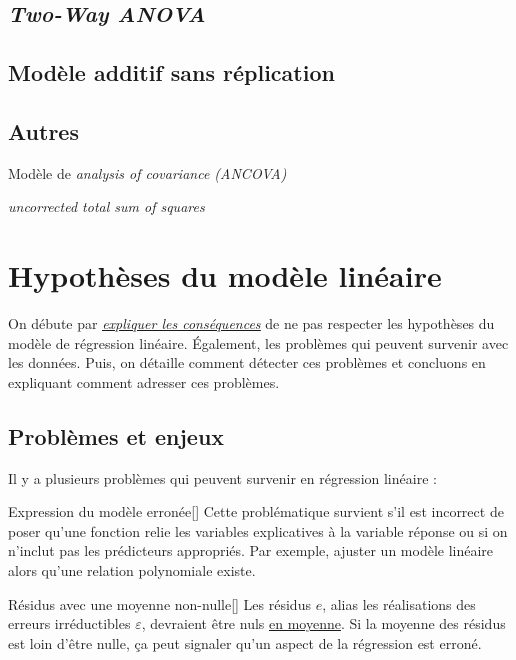 \documentclass[french]{article}
\begin{document}
\begin{multicols*}{2}
\subsection{\og \textit{Two-Way ANOVA} \fg{}}


\subsection{Modèle additif sans réplication}


\subsection{Autres}
Modèle de \og \textit{analysis of covariance (ANCOVA)} \fg{}

\og \textit{uncorrected total sum of squares} \fg{}




\newpage
\section{Hypothèses du modèle linéaire}\label{sec:hypothesisLM}
\begin{rappel_enhanced}[Contexte]
On débute par \textit{\color{bleudefrance}\underline{\hyperref[subsec:LMHProbIssues]{\color{bleudefrance} expliquer les conséquences}}} de ne pas respecter les hypothèses du modèle de régression linéaire. Également, les problèmes qui peuvent survenir avec les données. Puis, on détaille comment détecter ces problèmes et concluons en expliquant comment adresser ces problèmes. 
\end{rappel_enhanced}

\subsection{Problèmes et enjeux}\label{subsec:LMHProbIssues}
Il y a plusieurs problèmes qui peuvent survenir en régression linéaire :

\begin{definitionGENERAL}{Expression du modèle erronée}[]
Cette problématique survient s'il est incorrect de poser qu'une fonction relie les variables explicatives à la variable réponse ou si on n'inclut pas les prédicteurs appropriés. Par exemple, ajuster un modèle linéaire alors qu'une relation polynomiale existe.
\end{definitionGENERAL}

\begin{definitionGENERAL}{Résidus avec une moyenne non-nulle}[]
Les résidus $e$, alias les réalisations des erreurs irréductibles $\varepsilon$, devraient être nuls \underline{en moyenne}. Si la moyenne des résidus est loin d'être nulle, ça peut signaler qu'un aspect de la régression est erroné.
\end{definitionGENERAL}


\end{multicols*}
\end{document}
